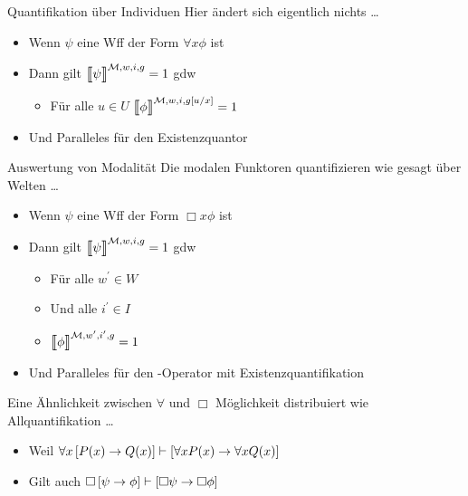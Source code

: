 \begin{frame}
  {Quantifikation über Individuen}
  \onslide<+->
  \onslide<+->
  Hier ändert sich eigentlich nichts \ldots\\
  \Halbzeile
  \begin{itemize}[<+->]
    \item Wenn \alert{$\psi$} eine Wff der Form \alert{$\forall x\phi$} ist
    \Viertelzeile
    \item Dann gilt \alert{$\DEMM{\psi}=1$} gdw
      \begin{itemize}[<+->]
        \item Für alle \alert{$u\in U$} \alert{$\Dem{\phi}{\mMm,w,i,g[u/x]}=1$}
      \end{itemize}
      \Viertelzeile
    \item Und Paralleles für den Existenzquantor
  \end{itemize}
\end{frame}

\begin{frame}
  {Auswertung von Modalität}
  \onslide<+->
  \onslide<+->
  Die modalen Funktoren quantifizieren wie gesagt über Welten \ldots\\
  \Halbzeile
  \onslide<+->
  \begin{itemize}[<+->]
    \item<1-> Wenn \alert{$\psi$} eine Wff der Form \alert{$\Box x\phi$} ist
      \Viertelzeile
    \item Dann gilt \alert{$\DEMM{\psi}=1$} gdw
      \begin{itemize}[<+->]
        \item Für alle \alert{$w^{\prime}\in W$}
        \item Und alle \alert{$i^{\prime}\in I$}
        \item \alert{$\Dem{\phi}{\mMm,w^{\prime},i^{\prime},g}=1$}
      \end{itemize}
      \Viertelzeile
    \item Und Paralleles für den \blau{$\Diamond$}-Operator mit Existenzquantifikation
  \end{itemize}
\end{frame}


\begin{frame}
  {Eine Ähnlichkeit zwischen $\forall$ und $\Box$}
  \onslide<+->
  \onslide<+->
  Möglichkeit distribuiert wie Allquantifikation \ldots\\
  \Halbzeile
  \begin{itemize}[<+->]
    \item Weil \alert{$\forall x\left[{}P(x)\rightarrow Q(x)\right]\vdash\left[{}\forall xP(x) \rightarrow \forall x Q(x)\right]$}\\
    \item Gilt auch \alert{$\Box\left[{}\psi\rightarrow\phi\right]\vdash\left[{}\Box \psi\rightarrow\Box\phi\right]$}\\
  \end{itemize}
\end{frame}

